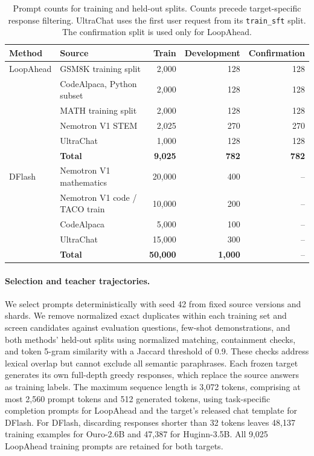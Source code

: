 \begin{table}[t]
  \centering
  \small
  \caption{Prompt counts for training and held-out splits.
  Counts precede target-specific response filtering.
  UltraChat uses the first user request from its \texttt{train\_sft} split.
  The confirmation split is used only for LoopAhead.}
  \label{tab:drafter-data}
  \begin{tabular}{llrrr}
    \toprule
    Method & Source & Train & Development & Confirmation \\
    \midrule
    LoopAhead & GSM8K training split & 2,000 & 128 & 128 \\
              & CodeAlpaca, Python subset & 2,000 & 128 & 128 \\
              & MATH training split & 2,000 & 128 & 128 \\
              & Nemotron V1 STEM & 2,025 & 270 & 270 \\
              & UltraChat & 1,000 & 128 & 128 \\
              & \textbf{Total} & \textbf{9,025} & \textbf{782} & \textbf{782} \\
    \midrule
    DFlash & Nemotron V1 mathematics & 20,000 & 400 & -- \\
           & Nemotron V1 code / TACO train & 10,000 & 200 & -- \\
           & CodeAlpaca & 5,000 & 100 & -- \\
           & UltraChat & 15,000 & 300 & -- \\
           & \textbf{Total} & \textbf{50,000} & \textbf{1,000} & -- \\
    \bottomrule
  \end{tabular}
\end{table}

\paragraph{Selection and teacher trajectories.}
We select prompts deterministically with seed 42 from fixed source
versions and shards.
We remove normalized exact duplicates within each training set and
screen candidates against evaluation questions, few-shot demonstrations,
and both methods' held-out splits using normalized matching, containment
checks, and token 5-gram similarity with a Jaccard threshold of 0.9.
These checks address lexical overlap but cannot exclude all semantic
paraphrases.
Each frozen target generates its own full-depth greedy responses,
which replace the source answers as training labels.
The maximum sequence length is 3,072 tokens, comprising at most
2,560 prompt tokens and 512 generated tokens,
using task-specific completion prompts for LoopAhead and the target's
released chat template for DFlash.
For DFlash, discarding responses shorter than 32 tokens leaves
48,137 training examples for Ouro-2.6B and 47,387 for Huginn-3.5B.
All 9,025 LoopAhead training prompts are retained for both targets.

